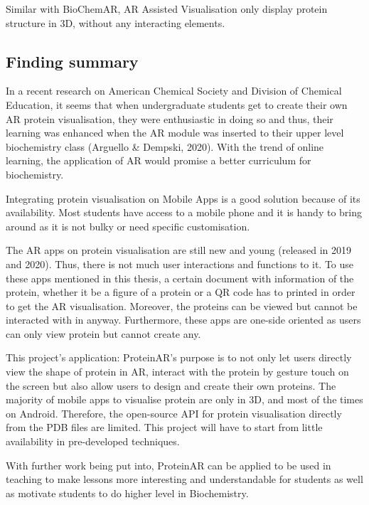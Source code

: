 Similar with BioChemAR, AR Assisted Visualisation only display protein structure in 3D, without any interacting elements. 

\subsection{Finding summary}
In a recent research on American Chemical Society and Division of Chemical Education, it seems that when undergraduate students get to create their own AR protein visualisation, they were enthusiastic in doing so and thus, their learning was enhanced when the AR module was inserted to their upper level biochemistry class (Arguello \& Dempski, 2020). With the trend of online learning, the application of AR would promise a better curriculum for biochemistry.

Integrating protein visualisation on Mobile Apps is a good solution because of its availability. Most students have access to a mobile phone and it is handy  to bring around as it is not bulky or need specific customisation. 

The AR apps on protein visualisation are still new and young (released in 2019 and 2020). Thus, there is not much user interactions and functions to it. To use these apps mentioned in this thesis, a certain document with information of the protein, whether it be a figure of a protein or a QR code has to printed in order to get the AR visualisation. Moreover, the proteins can be viewed but cannot be interacted with in anyway. Furthermore, these apps are one-side oriented as users can only view protein but cannot create any. 

This project’s application: ProteinAR’s purpose is to not only let users directly view the shape of protein in AR, interact with the protein by gesture touch on the screen but also allow users to design and create their own proteins. 
The majority of mobile apps to visualise protein are only in 3D, and most of the times on Android. Therefore, the open-source API for protein visualisation directly from the PDB files are limited. This project will have to start from little availability in pre-developed techniques.

With further work being put into, ProteinAR can be applied to be used in teaching to make lessons more interesting and understandable for students as well as motivate students to do higher level in Biochemistry. 




